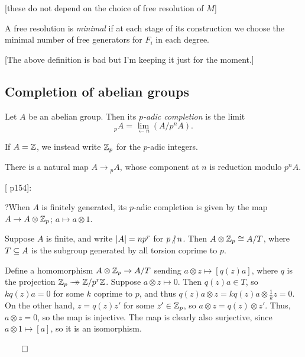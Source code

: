 \documentclass{MetricNotes2023}
\newcommand{\surj}{\rightarrow\mathrel{\mkern-14mu}\rightarrow}
\def\subq{\ensuremath\subseteq}
\def\inte{\ensuremath\mathbb{Z}}
\DeclareMathOperator{\Ext}{Ext}
\DeclareMathOperator{\im}{im}
\def\done{\begin{flushright}\vspace{-4.35ex}\(\qed\)\end{flushright}}
\def\nvert{\ensuremath\hspace{-0.5ex}\not\vert\hspace{0.5ex}}
\begin{document}

[these do not depend on the choice of free resolution of \(M\)]

A free resolution is \textit{minimal} if at each stage of its construction we choose the minimal number of free generators for \(F_i\) in each degree.

[The above definition is bad but I'm keeping it just for the moment.]

\subsection{Completion of abelian groups}

\begin{definition}
Let \(A\) be an abelian group. Then its \textit{\(p\)-adic completion} is the limit 
\[\text{}_pA=\lim\limits_{\leftarrow n} (A/p^nA).\]
\end{definition}

If \(A=\inte\), we instead write \(\inte_p\) for the \(p\)-adic integers.

There is a natural map \(A \to \text{}_pA\), whose component at \(n\) is reduction modulo \(p^nA\). 

[\autocite{concise} p154]:

?When \(A\) is finitely generated, its \(p\)-adic completion is given by the map \(A \to A\otimes \inte_p\); \(a\mapsto a\otimes 1\). 

\begin{lemma}\label{2504031247}
Suppose \(A\) is finite, and write \(\lvert A\rvert=np^r\) for \(p\nvert n\). Then \(A\otimes\inte_p\cong A/T\), where \(T\subq A\) is the subgroup generated by all torsion coprime to \(p\).
\end{lemma}

\begin{ourproof}
Define a homomorphism \(A\otimes\inte_p\to A/T\) sending \(a\otimes z \mapsto [q(z)a]\), where \(q\) is the projection \(\inte_p \surj \inte/p^r\inte\). Suppose \(a\otimes z\mapsto 0\). Then \(q(z)a\in T\), so \(kq(z)a=0\) for some \(k\) coprime to \(p\), and thus \(q(z)a\otimes z=kq(z)a\otimes \frac{1}{k}z=0\). On the other hand, \(z=q(z)z'\) for some \(z'\in \inte_p\), so \(a\otimes z = q(z) \otimes z'\). Thus, \(a\otimes z = 0\), so the map is injective. The map is clearly also surjective, since \(a\otimes 1 \mapsto [a]\), so it is an isomorphism. \done
\end{ourproof}
\end{document}

